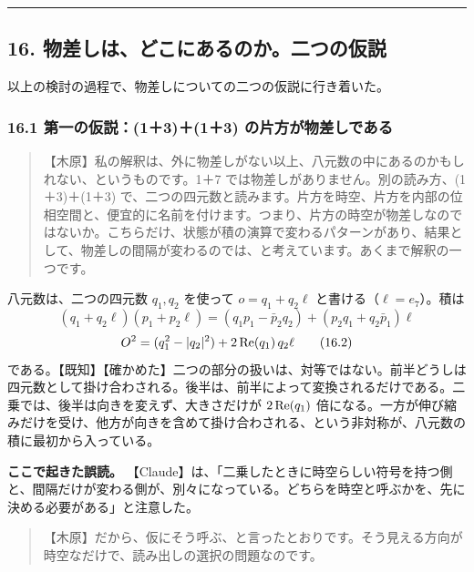 \documentclass[
  a4paper,
]{ltjsarticle}
\begin{document}
\begin{center}\rule{0.5\linewidth}{0.5pt}\end{center}

\subsection{16.
物差しは、どこにあるのか。二つの仮説}\label{ux7269ux5deeux3057ux306fux3069ux3053ux306bux3042ux308bux306eux304bux4e8cux3064ux306eux4eeeux8aac}

以上の検討の過程で、物差しについての二つの仮説に行き着いた。

\subsubsection{16.1 第一の仮説：(1＋3)＋(1＋3)
の片方が物差しである}\label{ux7b2cux4e00ux306eux4eeeux8aac1313-ux306eux7247ux65b9ux304cux7269ux5deeux3057ux3067ux3042ux308b}

\begin{quote}
【木原】私の解釈は、外に物差しがない以上、八元数の中にあるのかもしれない、というものです。1＋7
では物差しがありません。別の読み方、(1＋3)＋(1＋3)
で、二つの四元数と読みます。片方を時空、片方を内部の位相空間と、便宜的に名前を付けます。つまり、片方の時空が物差しなのではないか。こちらだけ、状態が積の演算で変わるパターンがあり、結果として、物差しの間隔が変わるのでは、と考えています。あくまで解釈の一つです。
\end{quote}

八元数は、二つの四元数 \(q_1, q_2\) を使って \(o = q_1 + q_2\ell\)
と書ける（\(\ell = e_7\)）。積は \[
(q_1 + q_2\ell)(p_1 + p_2\ell) = (q_1p_1 - \bar p_2q_2) + (p_2q_1 + q_2\bar p_1)\ell \tag{16.1}
\] \[
O^2 = (q_1^2 - \lvert q_2\rvert^2) + 2\,{\rm Re}(q_1)\,q_2\ell \tag{16.2}
\]
である。【既知】【確かめた】二つの部分の扱いは、対等ではない。前半どうしは四元数として掛け合わされる。後半は、前半によって変換されるだけである。二乗では、後半は向きを変えず、大きさだけが
\(2\,{\rm Re}(q_1)\)
倍になる。一方が伸び縮みだけを受け、他方が向きを含めて掛け合わされる、という非対称が、八元数の積に最初から入っている。

\textbf{ここで起きた誤読。}
【Claude】は、「二乗したときに時空らしい符号を持つ側と、間隔だけが変わる側が、別々になっている。どちらを時空と呼ぶかを、先に決める必要がある」と注意した。

\begin{quote}
【木原】だから、仮にそう呼ぶ、と言ったとおりです。そう見える方向が時空なだけで、読み出しの選択の問題なのです。
\end{quote}
\end{document}

